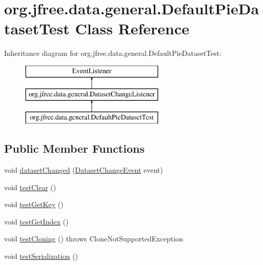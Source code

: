 \hypertarget{classorg_1_1jfree_1_1data_1_1general_1_1_default_pie_dataset_test}{}\section{org.\+jfree.\+data.\+general.\+Default\+Pie\+Dataset\+Test Class Reference}
\label{classorg_1_1jfree_1_1data_1_1general_1_1_default_pie_dataset_test}
Inheritance diagram for org.\+jfree.\+data.\+general.\+Default\+Pie\+Dataset\+Test\+:\begin{figure}[H]
\begin{center}
\leavevmode
\includegraphics[height=3.000000cm]{classorg_1_1jfree_1_1data_1_1general_1_1_default_pie_dataset_test}
\end{center}
\end{figure}
\subsection*{Public Member Functions}
\begin{DoxyCompactItemize}
\item 
void \mbox{\hyperlink{classorg_1_1jfree_1_1data_1_1general_1_1_default_pie_dataset_test_a75f7f7699640f9c594fe0ff43aae0e83}{dataset\+Changed}} (\mbox{\hyperlink{classorg_1_1jfree_1_1data_1_1general_1_1_dataset_change_event}{Dataset\+Change\+Event}} event)
\item 
void \mbox{\hyperlink{classorg_1_1jfree_1_1data_1_1general_1_1_default_pie_dataset_test_aee5a093a704c1791fe451f36e6119814}{test\+Clear}} ()
\item 
void \mbox{\hyperlink{classorg_1_1jfree_1_1data_1_1general_1_1_default_pie_dataset_test_a2527670468aa2d6141a4256988a7bf59}{test\+Get\+Key}} ()
\item 
void \mbox{\hyperlink{classorg_1_1jfree_1_1data_1_1general_1_1_default_pie_dataset_test_a563a9bcd39fd4031b5ccbd0687ee84ea}{test\+Get\+Index}} ()
\item 
void \mbox{\hyperlink{classorg_1_1jfree_1_1data_1_1general_1_1_default_pie_dataset_test_a6479457894f649667732cb40067971e5}{test\+Cloning}} ()  throws Clone\+Not\+Supported\+Exception 
\item 
void \mbox{\hyperlink{classorg_1_1jfree_1_1data_1_1general_1_1_default_pie_dataset_test_a8c0cd621331661d2c76b0c43df5d4100}{test\+Serialization}} ()
\end{DoxyCompactItemize}


